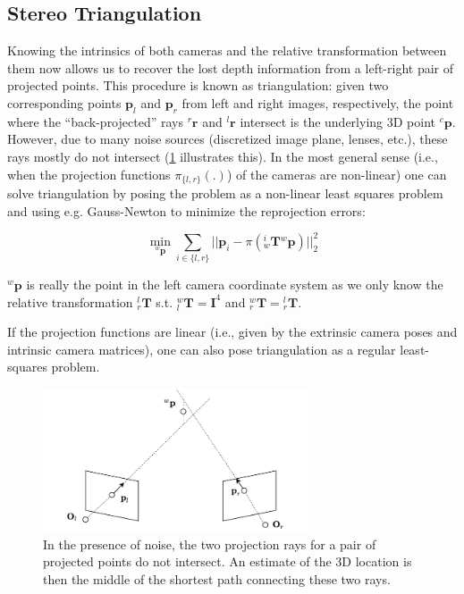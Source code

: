 \documentclass[headsepline, hidelinks, footsepline, footinclude=false, oneside, fontsize=11pt, paper=a4, listof=totoc, bibliography=totoc]{scrbook}
\begin{document}
\newpage
\subsection{Stereo Triangulation \label{triangulation}}
\label{sec:orgff4bed2}
    Knowing the intrinsics of both cameras and the relative transformation between them now allows us to recover the lost depth information from a left-right pair of projected points.
This procedure is known as triangulation: given two corresponding points  \(\mathbf{p}_l\) and \(\mathbf{p}_r\) from left and right images, respectively, the point where the ``back-projected'' 
rays \({}^r\mathbf{r}\) and \({}^l\mathbf{r}\) intersect is the underlying 3D point \({}^c\mathbf{p}\).
However, due to many noise sources (discretized image plane, lenses, etc.), these rays mostly do not intersect (\cref{fig:triangulation} illustrates this).
In the most general sense (i.e., when the projection functions \(\pi_{\{l, r\}}(.)\)) of the cameras are non-linear) one can solve triangulation by posing the problem as a non-linear least squares problem 
and using e.g. Gauss-Newton \cite{bjorckNumericalMethodsLeast1996} to minimize the reprojection errors:

\begin{equation}
\label{eq:triangulation-non-linear}
\min_{{}^w\mathbf{p}} \sum_{i \in \{l, r\}}||\mathbf{p}_i - \pi({}^i_w\mathbf{T}{}^w\mathbf{p})||_2^2
\end{equation}

\({}^w\mathbf{p}\) is really the point in the left camera coordinate system as we only know the relative transformation \({}^l_r\mathbf{T}\) s.t. \({}^w_l\mathbf{T} = \mathbf{I}^4\) and \({}^w_r \mathbf{T} = {}^l_r\mathbf{T}\). 

If the projection functions are linear (i.e., given by the extrinsic camera poses and intrinsic camera matrices), one can also pose triangulation as a regular least-squares problem.

\begin{figure}[htbp]
\centering
\includegraphics[width=0.7\textwidth]{figures/triangulation.pdf}
\caption{\label{fig:triangulation}In the presence of noise, the two projection rays for a pair of projected points do not intersect. An estimate of the 3D location is then the middle of the shortest path connecting these two rays.}
\end{figure}
\end{document}
